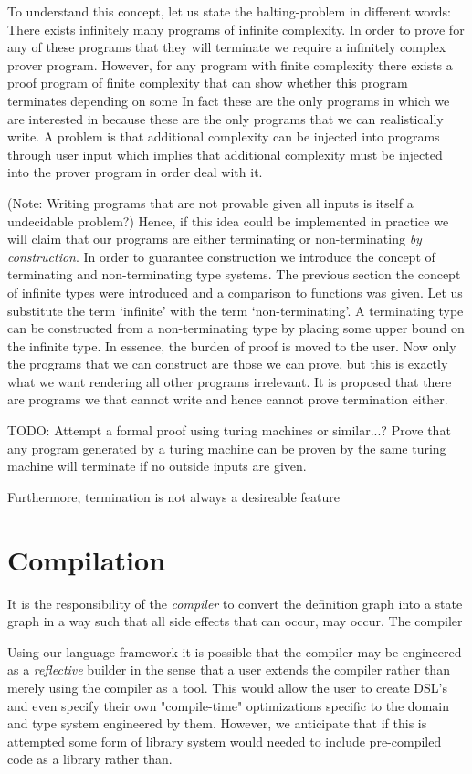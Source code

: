 \documentclass[11pt]{article}
\begin{document}
To understand this concept, let us state the halting-problem in different words:
There exists infinitely many programs of infinite complexity. In order to prove for any of these programs that they will terminate we require a infinitely complex prover program.
However, for any program with finite complexity there exists a proof program of finite complexity that can show whether this program terminates depending on some 
In fact these are the only programs in which we are interested in because these are the only programs that we can realistically write. 
A problem is that additional complexity can be injected into programs through user input which implies that additional complexity must be injected into the prover program in order deal with it.

(Note: Writing programs that are not provable given all inputs is itself a undecidable problem?)
Hence, if this idea could be implemented in practice we will claim that our programs are either terminating or non-terminating \emph{by construction}.
In order to guarantee construction we introduce the concept of terminating and non-terminating type systems.
The previous section the concept of infinite types were introduced and a comparison to functions was given.
Let us substitute the term `infinite' with the term `non-terminating'. A terminating type can be constructed from a non-terminating type by placing some upper bound on the infinite type.
In essence, the burden of proof is moved to the user.
Now only the programs that we can construct are those we can prove, but this is exactly what we want rendering all other programs irrelevant.
It is proposed that there are programs we that cannot write and hence cannot prove termination either.

TODO: Attempt a formal proof using turing machines or similar...? Prove that any program generated by a turing machine can be proven by the same turing machine will terminate if no outside inputs are given.


Furthermore, termination is not always a desireable feature

\section*{Compilation}
It is the responsibility of the \emph{compiler} to convert the definition graph into a state graph in a way such that all side effects that can occur, may occur. The compiler

Using our language framework it is possible that the compiler may be engineered as a \emph{reflective} builder in the sense that a user extends the compiler rather than merely using the compiler as a tool.
This would allow the user to create DSL's and even specify their own "compile-time" optimizations specific to the domain and type system engineered by them.
However, we anticipate that if this is attempted some form of library system would needed to include pre-compiled code as a library rather than.
\end{document}
